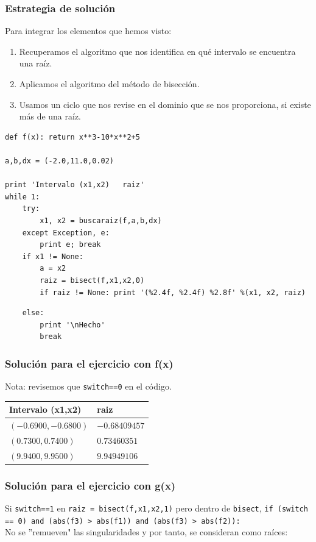 \documentclass[12pt]{beamer}
\begin{document}
\begin{frame}
\frametitle{Estrategia de soluci\'{o}n}
Para integrar los elementos que hemos visto:
\begin{enumerate}
\item Recuperamos el algoritmo que nos identifica en qu\'{e} intervalo se encuentra una ra\'{i}z.
\item Aplicamos el algoritmo del m\'{e}todo de bisecci\'{o}n.
\item Usamos un ciclo que nos revise en el dominio que se nos proporciona, si existe m\'{a}s de una ra\'{i}z.
\end{enumerate}
\end{frame}
\begin{frame}[fragile]
\begin{lstlisting}
def f(x): return x**3-10*x**2+5

a,b,dx = (-2.0,11.0,0.02)
	
print 'Intervalo (x1,x2)   raiz'
while 1:
    try:
        x1, x2 = buscaraiz(f,a,b,dx)
    except Exception, e:
        print e; break
    if x1 != None:
        a = x2
        raiz = bisect(f,x1,x2,0)
        if raiz != None: print '(%2.4f, %2.4f) %2.8f' %(x1, x2, raiz)
\end{lstlisting}
\end{frame}
\begin{frame}[fragile]
\begin{lstlisting}
    else:
        print '\nHecho'
        break
\end{lstlisting}
\end{frame}
\begin{frame}
\frametitle{Soluci\'{o}n para el ejercicio con f(x)}
Nota: revisemos que \texttt{switch==0} en el c\'{o}digo.
\begin{center}
	\begin{tabular}{ p{5cm} | p{3cm} }
		Intervalo (x1,x2) &   raiz \\ \hline
		$(-0.6900, -0.6800)$ & $-0.68409457$ \\ \hline
		$(0.7300, 0.7400)$ & $0.73460351$ \\ \hline
		$(9.9400, 9.9500)$ & $9.94949106$
	\end{tabular}
\end{center}
\end{frame}
\begin{frame}
\frametitle{Soluci\'{o}n para el ejercicio con g(x)}
Si \texttt{switch==1} en \texttt{raiz = bisect(f,x1,x2,1)} pero dentro de \texttt{bisect}, \texttt{if (switch == 0) and (abs(f3) > abs(f1)) and (abs(f3) > abs(f2)):}
\\
\medskip
No se ''remueven" las singularidades y por tanto, se consideran como ra\'{i}ces:
\end{frame}
\end{document}
